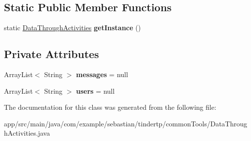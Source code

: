 \subsection*{Static Public Member Functions}
\begin{DoxyCompactItemize}
\item 
static \hyperlink{classcom_1_1example_1_1sebastian_1_1tindertp_1_1commonTools_1_1DataThroughActivities}{Data\+Through\+Activities} {\bfseries get\+Instance} ()\hypertarget{classcom_1_1example_1_1sebastian_1_1tindertp_1_1commonTools_1_1DataThroughActivities_ab46d5e630855ee0ca97ac9fad49ad2fe}{}\label{classcom_1_1example_1_1sebastian_1_1tindertp_1_1commonTools_1_1DataThroughActivities_ab46d5e630855ee0ca97ac9fad49ad2fe}

\end{DoxyCompactItemize}
\subsection*{Private Attributes}
\begin{DoxyCompactItemize}
\item 
Array\+List$<$ String $>$ {\bfseries messages} = null\hypertarget{classcom_1_1example_1_1sebastian_1_1tindertp_1_1commonTools_1_1DataThroughActivities_af6124170fb65c55f43b1f7a284f8e32d}{}\label{classcom_1_1example_1_1sebastian_1_1tindertp_1_1commonTools_1_1DataThroughActivities_af6124170fb65c55f43b1f7a284f8e32d}

\item 
Array\+List$<$ String $>$ {\bfseries users} = null\hypertarget{classcom_1_1example_1_1sebastian_1_1tindertp_1_1commonTools_1_1DataThroughActivities_a0d600cb94fad59fe0762bed9094079c7}{}\label{classcom_1_1example_1_1sebastian_1_1tindertp_1_1commonTools_1_1DataThroughActivities_a0d600cb94fad59fe0762bed9094079c7}

\end{DoxyCompactItemize}


The documentation for this class was generated from the following file\+:\begin{DoxyCompactItemize}
\item 
app/src/main/java/com/example/sebastian/tindertp/common\+Tools/Data\+Through\+Activities.\+java\end{DoxyCompactItemize}

